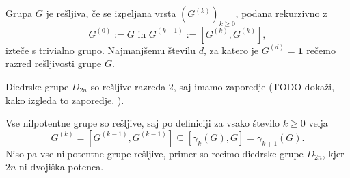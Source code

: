 \documentclass[mat1, tisk]{fmfdelo}
\numberwithin{equation}{section}  %
\begin{document}
\begin{definicija}
    \label{def_resljiva_grupa}
    Grupa $G$ je rešljiva, če se izpeljana vrsta $(G^{(k)})_{k \ge 0}$, podana rekurzivno z \begin{equation*}
        G^{(0)} := G \text{ in } G^{(k + 1)} := [G^{(k)}, G^{(k)}],
        \end{equation*}  
        izteče s trivialno grupo. Najmanjšemu številu $d$, za katero je $G^{(d)} = \mathbf{1}$ rečemo razred rešljivosti grupe $G$.    
    \end{definicija}
    
    \begin{primer}
    Diedrske grupe $D_{2n}$ so rešljive razreda $2$, saj imamo zaporedje (TODO dokaži, kako izgleda to zaporedje. ).  %
    \end{primer}
    
    \begin{primer}
        Vse nilpotentne grupe so rešljive, saj po definiciji za vsako število $k \ge 0$ velja \begin{equation*}
        G^{(k)} = [G^{(k-1)}, G^{(k-1)}] \subseteq  [\gamma_k(G), G] = \gamma_{k +1}(G).
        \end{equation*}
        Niso pa vse nilpotentne grupe rešljive, primer so recimo diedrske grupe $D_{2n}$, kjer $2n$ ni dvojiška potenca. 
    \end{primer}
    
\end{document}
